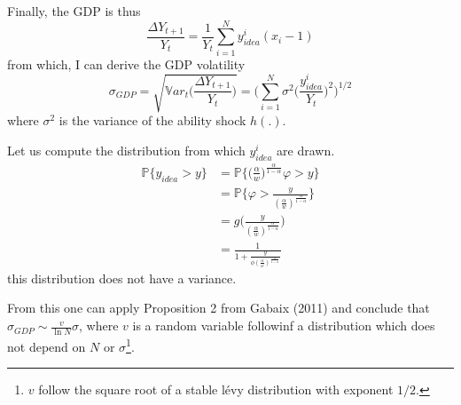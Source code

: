 \documentclass[12pt]{article}
\begin{document}
Finally, the GDP is thus
\begin{equation*}
\frac{\Delta Y_{t+1}}{Y_t} = \frac{1}{Y_t} \sum_{i=1}^N y^i_{idea} ( x_i - 1 )
\end{equation*}
from which, I can derive the GDP volatility
\begin{equation*}
  \sigma_{GDP} = \sqrt{\mathbb{V}ar_t \Big( \frac{\Delta Y_{t+1}}{Y_t} \Big) } = \Big( \sum_{i=1}^N \sigma^2 \Big( \frac{y^i_{idea}}{Y_t} \Big)^2 \Big)^{1/2}
\end{equation*}
where $\sigma^2$ is the variance of the ability shock $h(.)$.

Let us compute the distribution from which $y^i_{idea}$ are drawn.
\begin{align*}
\mathbb{P}\{ y_{idea} > y \} &= \mathbb{P}\{ \Big( \frac{\alpha}{w} \Big)^{\frac{\alpha}{1-\alpha}} \varphi > y \} \\
&= \mathbb{P}\Big\{  \varphi > \frac{y}{( \frac{\alpha}{w} )^{\frac{\alpha}{1-\alpha}} } \Big\} \\
&= g\Big(\frac{y}{( \frac{\alpha}{w} )^{\frac{\alpha}{1-\alpha}} }\Big)\\
&=  \frac{1}{1+\frac{y}{\phi( \frac{\alpha}{w} )^{\frac{\alpha}{1-\alpha}} }}
\end{align*}
this distribution does not have a variance.

From this one can apply Proposition 2 from Gabaix (2011)  \nocite{Gaba11} and conclude that $\sigma_{GDP} \sim \frac{v}{\ln N}\sigma$, where $v$ is a random variable followinf a distribution which does not depend on $N$ or $\sigma$\footnote{$v$ follow the square root of a stable l\'evy distribution with exponent $1/2$.}.




\end{document}
